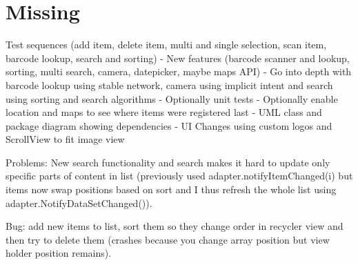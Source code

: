 \documentclass{article}
\begin{document}
\section{Missing}
Test sequences (add item, delete item, multi and single selection, scan item, barcode lookup, search and sorting)
- New features (barcode scanner and lookup, sorting, multi search, camera, datepicker, maybe maps API)
- Go into depth with barcode lookup using stable network, camera using implicit intent and search using sorting and search algorithms 
- Optionally unit tests 
- Optionally enable location and maps to see where items were registered last 
- UML class and package diagram showing dependencies 
- UI Changes using custom logos and ScrollView to fit image view 

Problems:
New search functionality and search makes it hard to update only specific parts of content in list (previously used adapter.notifyItemChanged(i) but items now swap positions based on sort and I thus refresh the whole list using adapter.NotifyDataSetChanged()).

Bug: add new items to list, sort them so they change order in recycler view and then try to delete them (crashes because you change array position but view holder position remains). 


	
\end{document}
